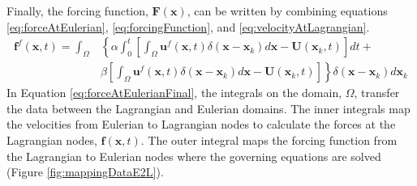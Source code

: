 \documentclass[12pt]{aiaa-pretty}
\begin{document}
%
Finally, the forcing function, $\mathbf{F}(\mathbf{x})$, can be written by combining equations \eqref{eq:forceAtEulerian}, \eqref{eq:forcingFunction}, and \eqref{eq:velocityAtLagrangian}.
%
\begin{equation}
\begin{aligned}\label{eq:forceAtEulerianFinal}
	\mathbf{f}^f(\mathbf{x}, t) = 
	\int_\Omega 
	&\left\{
 	\alpha \int_0^t
	\left[
	\int_\Omega \mathbf{u}^f (\mathbf{x}, t) \delta(\mathbf{x} - \mathbf{x}_k) d\mathbf{x} - \mathbf{U}\left( \mathbf{x}_k, t \right)
	\right]dt + \right. \\
	&\left.
	\beta \left[
	\int_\Omega \mathbf{u}^f (\mathbf{x}, t) \delta(\mathbf{x} - \mathbf{x}_k) d\mathbf{x} - \mathbf{U}\left( \mathbf{x}_k, t \right)
	\right]
	\right\} \delta(\mathbf{x} - \mathbf{x}_k) d\mathbf{x}_k
\end{aligned}
\end{equation}
%
In Equation \eqref{eq:forceAtEulerianFinal}, the integrals on the domain, $\Omega$, transfer the data between the Lagrangian and Eulerian domains. The inner integrals map the velocities from Eulerian to Lagrangian nodes to calculate the forces at the Lagrangian nodes, $\mathbf{f}\left( \mathbf{x}, t \right)$. The outer integral maps the forcing function from the Lagrangian to Eulerian nodes where the governing equations are solved (Figure \ref{fig:mappingDataE2L}).
%
\end{document}
